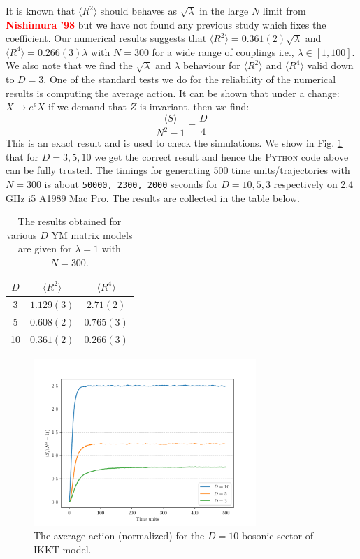 \documentclass[11pt]{article}
\newcommand{\TODO}[1]{\textcolor{red}{{\bf #1}}}
\newcommand{\PY}{\textsc{Python }}
\begin{document}
It is known that $\langle R^2 \rangle$ should behaves as $\sqrt{\lambda}$ in the large $N$ limit 
from \TODO{Nishimura '98} but we have not found any previous study which fixes the coefficient. 
Our numerical results suggests 
that $ \langle R^2 \rangle = 0.361(2) \sqrt{\lambda}$ 
and $ \langle R^4 \rangle = 0.266(3) \lambda$ with $N = 300$ for a wide range of couplings i.e., 
$\lambda \in [1,100]$. We also note that we find the $\sqrt{\lambda}$ and $\lambda$ behaviour for 
$\langle R^2 \rangle$ and $\langle R^4 \rangle$ valid down to $D=3$. 
One of the standard tests we do for the reliability of the numerical results is 
computing the average action. It can be shown that under a 
change: $X \to e^{\epsilon} X$ if we demand that $Z$ is invariant, 
then we find:
\begin{equation}
\label{eq:SD_IKKT1} 
	\frac{\langle S \rangle}{N^2 - 1} = \frac{D}{4} 
\end{equation}
This is an exact result and is used to check the simulations. We show in Fig. \ref{fig:IKKT_2} that for $D=3,5,10$ we get the correct result and 
hence the \PY code above can be fully trusted. The timings for generating 500 time units/trajectories 
with $N=300$ is about \texttt{50000, 2300, 2000} seconds for $D = 10, 5, 3$ respectively on 2.4 GHz i5 A1989 Mac Pro. 
The results are collected in the table below. 
\begin{table}[h!]
	\centering
	\begin{tabular}{||c c c||} 
		\hline
		$D$ & $ \langle R^2 \rangle$ & $ \langle R^4 \rangle$ \\ [0.5ex] 
		\hline\hline
		3 & $1.129(3) $ & $2.71(2) $  \\ 
		5 & $0.608(2) $ & $0.765(3) $  \\
		10 & $0.361(2)$ & $0.266(3)$
		 \\ [1ex] 
		\hline 
	\end{tabular}
\caption{The results obtained for various $D$ YM matrix models are given for $\lambda=1$ with $N=300$.}
\label{table:D_IKKT_data}
\end{table}


\begin{figure}[htbp] 
	\centering 
	\includegraphics[width=0.75\textwidth]{figs/act_allD_YM.pdf}
	\caption{\label{fig:IKKT_2}The average action (normalized) for the $D=10$ bosonic sector of IKKT model.}
\end{figure}
\end{document}
